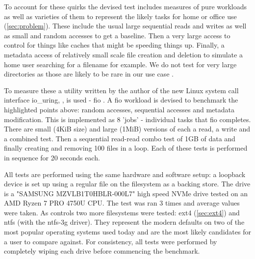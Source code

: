         To account for these quirks the devised test includes measures of pure
        workloads as well as varieties of them to represent the likely tasks
        for home or office use (\autoref{sec:problem}). These include the usual
        large sequential reads and writes as well as small and random accesses
        to get a baseline. Then a very large access to control for things like
        caches that might be speeding things up. Finally, a metadata access of
        relatively small scale file creation and deletion to simulate a home
        user searching for a filename for example. We do not test for very
        large directories as those are likely to be rare in our use case
        \cite{contents_study}.


        To measure these a utility written by the author of the new Linux
        system call interface io\_uring, , is used - fio
        \cite{fio}. A fio workload is devised to benchmark the highlighted
        points above: random accesses, sequential accesses and metadata
        modification. This is implemented as 8 'jobs' - individual tasks that
        fio completes. There are small (4KiB size) and large (1MiB) versions
        of each a read, a write and a combined test. Then a sequential
        read-read combo test of 1GB of data and finally creating and removing
        100 files in a loop. Each of these tests is performed in sequence for
        20 seconds each.

        All tests are performed using the same hardware and software setup: a
        loopback device is set up using a regular file on the filesystem as a
        backing store. The drive is a "SAMSUNG MZVLB1T0HBLR-000L7" high speed
        NVMe drive tested on an AMD Ryzen 7 PRO 4750U CPU. The test was ran 3
        times and average values were taken. As controls two more filesystems
        were tested: ext4 (\autoref{sec:ext4}) and ntfs (with the ntfs-3g driver).
        They represent the modern defaults on two of the most popular operating
        systems used today and are the most likely candidates for a user to
        compare against. For consistency, all tests were performed by
        completely wiping each drive before commencing the benchmark.


